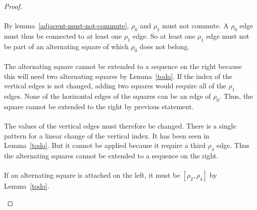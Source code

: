 \begin{proof}
\paragraph{}
By lemma~\ref{adjacent-must-not-commute}, $\rho_0$ and $\rho_1$ must not commute. A $\rho_0$ edge must thus be connected to at least one $\rho_1$ edge. So at least one $\rho_1$ edge must not be part of an alternating square of which $\rho_0$ does not belong.

\paragraph{}
The alternating square cannot be extended to a sequence on the right because this will need two alternating squares by Lemma~\ref{todo}. If the index of the vertical edges is not changed, adding two squares would require all of the $\rho_1$ edges. None of the horizontal edges of the squares can be an edge of $\rho_0$. Thus, the square cannot be extended to the right by previous statement.

\paragraph{}
The values of the vertical edges must therefore be changed. There is a single pattern for a linear change of the vertical index. It has been seen in Lemma~\ref{todo}. But it cannot be applied because it require a third $\rho_4$ edge. Thus the alternating squares cannot be extended to a sequence on the right.

\paragraph{}
If an alternating square is attached on the left, it must be $[\rho_2, \rho_4]$ by Lemma~\ref{todo}.

\begin{figure}[H]
  \begin{center}
\end{center}
\end{figure}
\end{proof}
